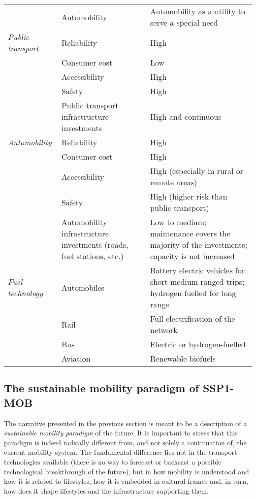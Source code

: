 \begin{table}
\begin{tabular}{p{2.5cm}p{3cm}p{8cm}}
 & Automobility & Automobility as a utility to serve a special need \\\addlinespace
\textit{Public transport} & Reliability & High \\
 & Consumer cost & Low \\
 & Accessibility & High \\
 & Safety & High \\
 & Public transport infrastructure investments & High and continuous \\\addlinespace
\textit{Automobility} & Reliability & High \\
 & Consumer cost & High \\
 & Accessibility & High (especially in rural or remote areas) \\
 & Safety & High (higher risk than public transport) \\
 & Automobility infrastructure investments (roads, fuel stations, etc.) & Low to medium; maintenance covers the majority of the investments; capacity is not increased \\\addlinespace 
\textit{Fuel technology} & Automobiles & Battery electric vehicles for short-medium ranged trips; hydrogen fuelled for long range \\
 & Rail & Full electrification of the network \\
 & Bus & Electric or hydrogen-fuelled \\
 & Aviation & Renewable biofuels \\ \bottomrule
\end{tabular}
\end{table}

\subsection{The sustainable mobility paradigm of SSP1-MOB}
\label{ss:results:ssp1-mob-paradigm}

The narrative presented in the previous section is meant to be a description of a \emph{sustainable mobility paradigm} of the future. It is important to stress that this paradigm is indeed radically different from, and not solely a continuation of, the current mobility system. The fundamental difference lies not in the transport technologies available (there is no way to forecast or backcast a possible technological breakthrough of the future), but in how mobility is understood and how it is related to lifestyles, how it is embedded in cultural frames and, in turn, how does it shape lifestyles and the infrastructure supporting them.

